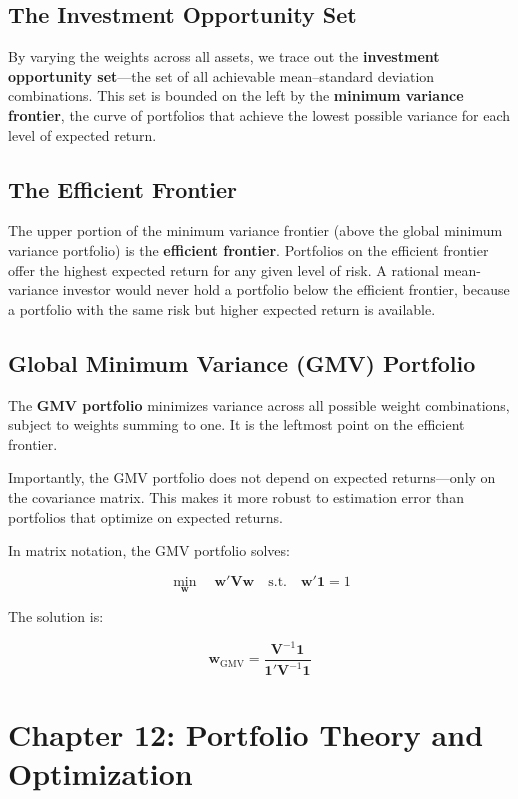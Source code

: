 \documentclass[11pt,letterpaper]{report}
\begin{document}
\section{The Investment Opportunity Set}


By varying the weights across all assets, we trace out the \textbf{investment opportunity set}---the set of all achievable mean--standard deviation combinations.  This set is bounded on the left by the \textbf{minimum variance frontier}, the curve of portfolios that achieve the lowest possible variance for each level of expected return.

\section{The Efficient Frontier}


The upper portion of the minimum variance frontier (above the global minimum variance portfolio) is the \textbf{efficient frontier}.  Portfolios on the efficient frontier offer the highest expected return for any given level of risk.  A rational mean-variance investor would never hold a portfolio below the efficient frontier, because a portfolio with the same risk but higher expected return is available.

\section{Global Minimum Variance (GMV) Portfolio}


The \textbf{GMV portfolio} minimizes variance across all possible weight combinations, subject to weights summing to one.  It is the leftmost point on the efficient frontier.

Importantly, the GMV portfolio does not depend on expected returns---only on the covariance matrix.  This makes it more robust to estimation error than portfolios that optimize on expected returns.

In matrix notation, the GMV portfolio solves:

$$\min_{\mathbf{w}} \quad \mathbf{w}' \mathbf{V} \mathbf{w} \quad \text{s.t.} \quad \mathbf{w}' \mathbf{1} = 1$$

The solution is:

$$\mathbf{w}_{\text{GMV}} = \frac{\mathbf{V}^{-1} \mathbf{1}}{\mathbf{1}' \mathbf{V}^{-1} \mathbf{1}}$$


\chapter{Chapter 12: Portfolio Theory and Optimization}
\end{document}
